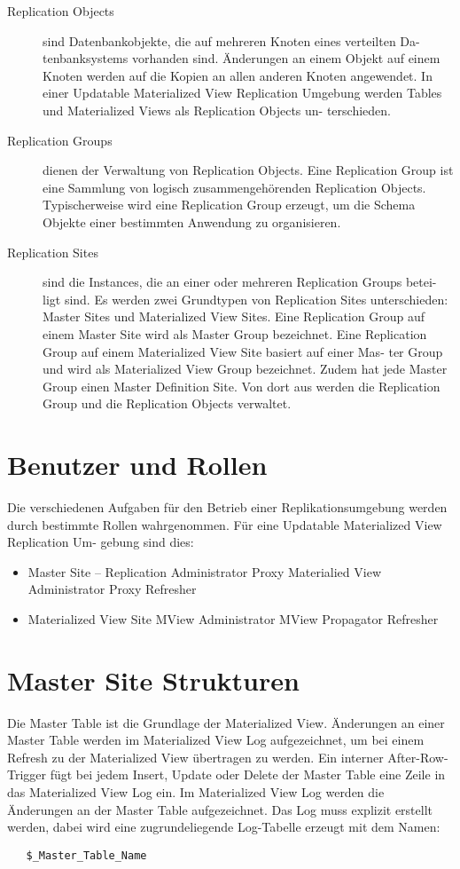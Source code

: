\documentclass[a4paper,10pt,titlepage=false]{scrreprt}
\begin{document}
\begin{description}
  \item[Replication Objects]sind Datenbankobjekte, die auf mehreren Knoten eines verteilten Da-
tenbanksystems vorhanden sind. Änderungen an einem Objekt auf einem Knoten werden
auf die Kopien an allen anderen Knoten angewendet. In einer Updatable Materialized View
Replication Umgebung werden Tables und Materialized Views als Replication Objects un-
terschieden.
\item[Replication Groups] dienen der Verwaltung von Replication Objects. Eine Replication Group
ist eine Sammlung von logisch zusammengehörenden Replication Objects. Typischerweise
wird eine Replication Group erzeugt, um die Schema Objekte einer bestimmten Anwendung
zu organisieren.
\item[Replication Sites] sind die Instances, die an einer oder mehreren Replication Groups betei-
ligt sind. Es werden zwei Grundtypen von Replication Sites unterschieden: Master Sites und
Materialized View Sites. Eine Replication Group auf einem Master Site wird als Master Group
bezeichnet. Eine Replication Group auf einem Materialized View Site basiert auf einer Mas-
ter Group und wird als Materialized View Group bezeichnet. Zudem hat jede Master Group
einen Master Definition Site. Von dort aus werden die Replication Group und die Replication
Objects verwaltet.
\end{description}
\section{Benutzer und Rollen} %
\label{sec:benutzer_und_rollen}
Die verschiedenen Aufgaben für den Betrieb einer Replikationsumgebung werden durch
bestimmte Rollen wahrgenommen. Für eine Updatable Materialized View Replication Um-
gebung sind dies:
\begin{itemize}
  \item Master Site
  \subitem – Replication Administrator
 \subitem Proxy Materialied View Administrator
\subitem  Proxy Refresher
\item Materialized View Site
\subitem MView Administrator
\subitem MView Propagator
\subitem Refresher
\end{itemize}
\section{Master Site Strukturen} %
\label{sec:master_site_strukturen}
Die Master Table ist die Grundlage der Materialized View. Änderungen an einer Master Table
werden im Materialized View Log aufgezeichnet, um bei einem Refresh zu der Materialized
View übertragen zu werden.
Ein interner After-Row-Trigger fügt bei jedem Insert, Update oder Delete der Master Table
eine Zeile in das Materialized View Log ein.
Im Materialized View Log werden die Änderungen an der Master Table aufgezeichnet. Das
Log muss explizit erstellt werden, dabei wird eine zugrundeliegende Log-Tabelle erzeugt
mit dem Namen:
\begin{verbatim}
   $_Master_Table_Name
\end{verbatim}
\end{document}
